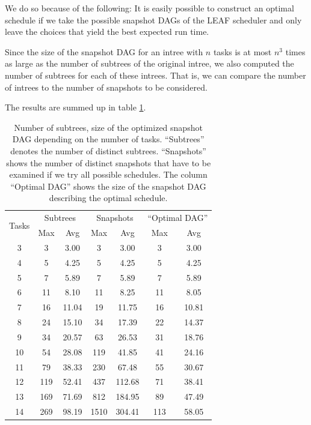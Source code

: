 We do so because of the following: It is easily possible to construct an optimal schedule if we take the possible snapshot DAGs of the LEAF scheduler and only leave the choices that yield the best expected run time.

Since the size of the snapshot DAG for an intree with $n$ tasks is at most $n^3$ times as large as the number of subtrees of the original intree, we also computed the number of subtrees for each of these intrees.
That is, we can compare the number of intrees to the number of snapshots to be considered.

The results are summed up in table \ref{tab:num-subtrees-size-of-dags}.

\begin{table}[ht]
  \centering
  \begin{tabular}[ht]{ccccccc}
    \multirow{2}{*}{Tasks} & \multicolumn{2}{c}{Subtrees} & \multicolumn{2}{c}{Snapshots} & \multicolumn{2}{c}{``Optimal DAG''} \\
    & Max & Avg & Max & Avg & Max & Avg \\
    \hline
    3 & 3 & 3.00 & 3 & 3.00 & 3 & 3.00  \\
    4 & 5 & 4.25 & 5 & 4.25 & 5 & 4.25  \\
    5 & 7 & 5.89 & 7 & 5.89 & 7 & 5.89  \\
    6 & 11 & 8.10 & 11 & 8.25 & 11 & 8.05  \\
    7 & 16 & 11.04 & 19 & 11.75 & 16 & 10.81  \\
    8 & 24 &  15.10 & 34 & 17.39 & 22 & 14.37  \\
    9 & 34 &  20.57 & 63 & 26.53 & 31 & 18.76  \\
    10 & 54 &  28.08 & 119 & 41.85 & 41 & 24.16  \\
    11 & 79 &  38.33 & 230 & 67.48 & 55 & 30.67  \\
    12 & 119 & 52.41 & 437 & 112.68 & 71 & 38.41  \\
    13 & 169 &  71.69 & 812 & 184.95 & 89 & 47.49  \\
    14 & 269 &  98.19 & 1510 & 304.41 & 113 & 58.05  \\
  \end{tabular}
  \caption{Number of subtrees, size of the optimized snapshot DAG depending on the number of tasks. ``Subtrees'' denotes the number of distinct subtrees. ``Snapshots'' shows the number of distinct snapshots that have to be examined if we try all possible schedules. The column ``Optimal DAG'' shows the size of the snapshot DAG describing the optimal schedule.}
  \label{tab:num-subtrees-size-of-dags}
\end{table}

